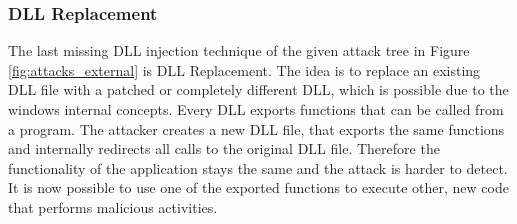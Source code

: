 \subsubsection{DLL Replacement}
The last missing \gls{DLL} injection technique of the given attack tree in Figure \ref{fig:attacks_external} is \gls{DLL} Replacement. The idea is to replace an existing \gls{DLL} file with a patched or completely different \gls{DLL}, which is possible due to the windows internal concepts. Every \gls{DLL} exports functions that can be called from a program. The attacker creates a new \gls{DLL} file, that exports the same functions and internally redirects all calls to the original \gls{DLL} file. Therefore the functionality of the application stays the same and the attack is harder to detect. It is now possible to use one of the exported functions to execute other, new code that performs malicious activities.